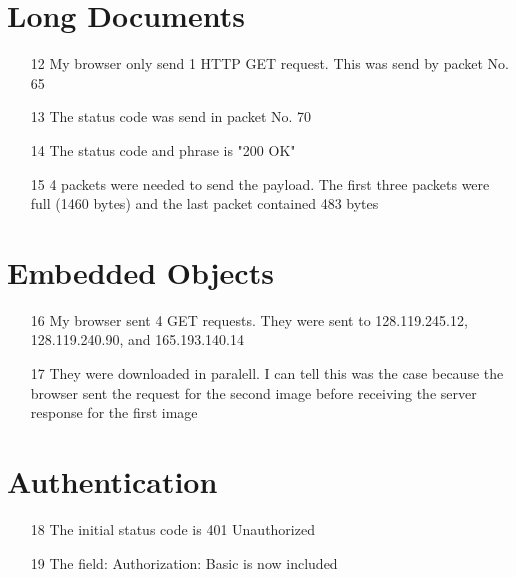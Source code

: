 \documentclass[11pt]{article}
\theoremstyle{definition}
\begin{document}
\section*{Long Documents}
\begin{enumerate}
	\item[12] My browser only send 1 HTTP GET request.  This was send by packet No. 65\\

	\item[13] The status code was send in packet No. 70\\

	\item[14] The status code and phrase is "200 OK"\\

	\item[15] 4 packets were needed to send the payload.  The first three packets were full (1460 bytes) and the last packet contained 483 bytes\\
\end{enumerate}

\section*{Embedded Objects}
\begin{enumerate}
	\item[16] My browser sent 4 GET requests.  They were sent to 128.119.245.12, 128.119.240.90, and 165.193.140.14

	\item[17] They were downloaded in paralell.  I can tell this was the case because the browser sent the request for the second image before receiving the server response for the first image\\
\end{enumerate}

\section*{Authentication}
\begin{enumerate}
	\item[18] The initial status code is 401 Unauthorized

	\item[19] The field: Authorization: Basic is now included
\end{enumerate}
\end{document}
